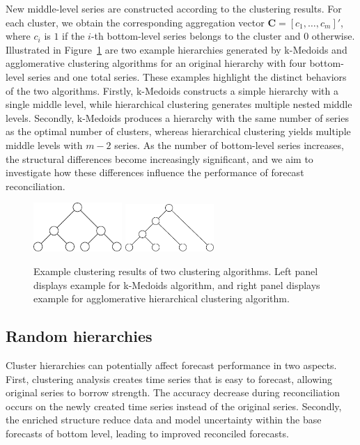 \documentclass[a4paper,review,12pt,authoryear]{elsarticle}
\begin{document}
New middle-level series are constructed according to the clustering results. For each cluster, we obtain the corresponding aggregation vector $\boldsymbol{C} = [c_{1}, \dots, c_{m}]'$, where $c_{i}$ is $1$ if the $i$-th bottom-level series belongs to the cluster and $0$ otherwise.
Illustrated in Figure~\ref{fig:cluster_example} are two example hierarchies generated by k-Medoids and agglomerative clustering algorithms for an original hierarchy with four bottom-level series and one total series. These examples highlight the distinct behaviors of the two algorithms.
Firstly, k-Medoids constructs a simple hierarchy with a single middle level, while hierarchical clustering generates multiple nested middle levels. 
Secondly, k-Medoids produces a hierarchy with the same number of series as the optimal number of clusters, whereas hierarchical clustering yields multiple middle levels with $m-2$ series.
As the number of bottom-level series increases, the structural differences become increasingly significant, and we aim to investigate how these differences influence the performance of forecast reconciliation.

\begin{figure}
    \centering
    \includegraphics[width=0.3\textwidth]{figures/pamcluster.pdf}
    \hspace{1cm}
    \includegraphics[width=0.3\textwidth]{figures/aggcluster.pdf}
    \caption{\label{fig:cluster_example}Example clustering results of two clustering algorithms. Left panel displays example for k-Medoids algorithm, and right panel displays example for agglomerative hierarchical clustering algorithm.}
\end{figure}


\subsection{Random hierarchies}
\label{sec:random}
 
Cluster hierarchies can potentially affect forecast performance in two aspects. First, clustering analysis creates time series that is easy to forecast, allowing original series to borrow strength. The accuracy decrease during reconciliation occurs on the newly created time series instead of the original series. Secondly, the enriched structure reduce data and model uncertainty within the base forecasts of bottom level, leading to improved reconciled forecasts.
\end{document}
